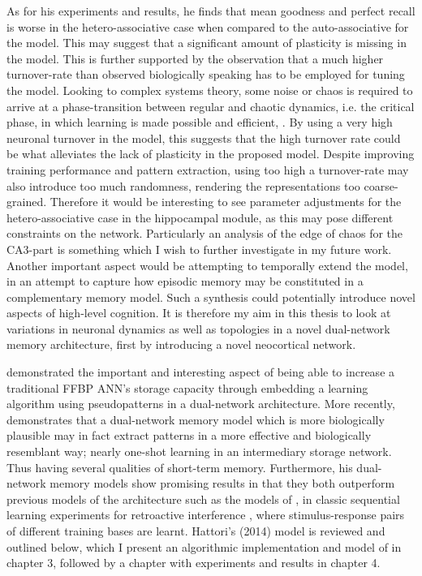 As for his experiments and results, he finds that mean goodness and perfect recall is worse in the hetero-associative case when compared to the auto-associative for the model. This may suggest that a significant amount of plasticity is missing in the model. This is further supported by the observation that a much higher turnover-rate than observed biologically speaking has to be employed for tuning the model. Looking to complex systems theory, some noise or chaos is required to arrive at a phase-transition between regular and chaotic dynamics, i.e. the critical phase, in which learning is made possible and efficient, \cite{Langton1990, Newman2003}. By using a very high neuronal turnover in the model, this suggests that the high turnover rate could be what alleviates the lack of plasticity in the proposed model. Despite improving training performance and pattern extraction, using too high a turnover-rate may also introduce too much randomness, rendering the representations too coarse-grained. Therefore it would be interesting to see parameter adjustments for the hetero-associative case in the hippocampal module, as this may pose different constraints on the network. Particularly an analysis of the edge of chaos for the CA3-part is something which I wish to further investigate in my future work. Another important aspect would be attempting to temporally extend the model, in an attempt to capture how episodic memory may be constituted in a complementary memory model. Such a synthesis could potentially introduce novel aspects of high-level cognition. It is therefore my aim in this thesis to look at variations in neuronal dynamics as well as topologies in a novel dual-network memory architecture, first by introducing a novel neocortical network.


\cite{Ans1997} demonstrated the important and interesting aspect of being able to increase a traditional FFBP ANN's storage capacity through embedding a learning algorithm using pseudopatterns in a dual-network architecture. More recently, \cite{Hattori2010, Hattori2014} demonstrates that a dual-network memory model which is more biologically plausible may in fact extract patterns in a more effective and biologically resemblant way; nearly one-shot learning in an intermediary storage network. Thus having several qualities of short-term memory. Furthermore, his dual-network memory models show promising results in that they both outperform previous models of the architecture such as the models of \citep{French1997, Ans1997}, in classic sequential learning experiments for retroactive interference \citep{McCloskey1989}, where stimulus-response pairs of different training bases are learnt.
Hattori's (2014) model is reviewed and outlined below, which I present an algorithmic implementation and model of in chapter 3, followed by a chapter with experiments and results in chapter 4.

